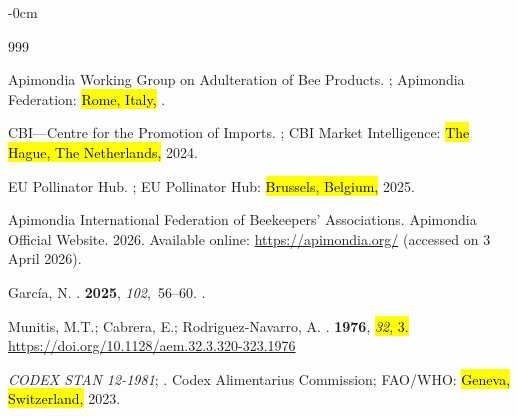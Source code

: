 \documentclass[foods,review,accept,pdftex,moreauthors]{Definitions/mdpi}
\begin{document}
{%
\begin{adjustwidth}{-\extralength}{0cm}


\begin{thebibliography}{999}

{Apimondia Working Group on Adulteration of Bee Products}. 
; Apimondia Federation: \hl{Rome, Italy,} %
.  

{CBI---Centre for the Promotion of Imports}.
; 
\newblock CBI Market Intelligence: \hl{The Hague, The Netherlands,} 
  2024.

{EU Pollinator Hub}.
;
\newblock EU Pollinator Hub: \hl{Brussels, Belgium,}  2025.

{Apimondia International Federation of Beekeepers' Associations}.
\newblock Apimondia Official Website.  2026.  Available online:  \url{https://apimondia.org/}  (accessed on 3 April 2026).

Garc{\'i}a, N.
.
 {\bf 2025}, {\em 102},~56--60.
.

Munitis, M.T.;  Cabrera, E.; Rodriguez-Navarro, A.
.
 {\bf 1976}, \hl{\emph{32}, 3.}
 \url{https://doi.org/10.1128/aem.32.3.320-323.1976}

{\emph{CODEX STAN 12-1981}}; 
. Codex Alimentarius Commission; 
\newblock FAO/WHO: \hl{Geneva, Switzerland,}  2023.


\end{thebibliography}
\end{adjustwidth}}
\end{document}
